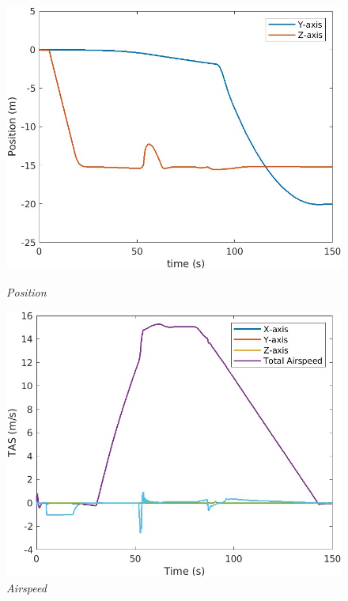 \begin{figure}[htbp]
  \centering
  \begin{minipage}[b]{0.45\textwidth}
    \centering
    \includegraphics[width=\textwidth]{Images/TRANS/1 position_1.jpg}
    \caption*{\textit{Position}}
  \end{minipage}
  \hfil
  \begin{minipage}[b]{0.45\textwidth}
    \centering
    \includegraphics[width=\textwidth]{Images/TRANS/2 TAS_1.jpg}
    \caption*{\textit{Airspeed}}
  \end{minipage}
  \begin{minipage}[b]{0.45\textwidth}

\end{minipage}
\end{figure}
